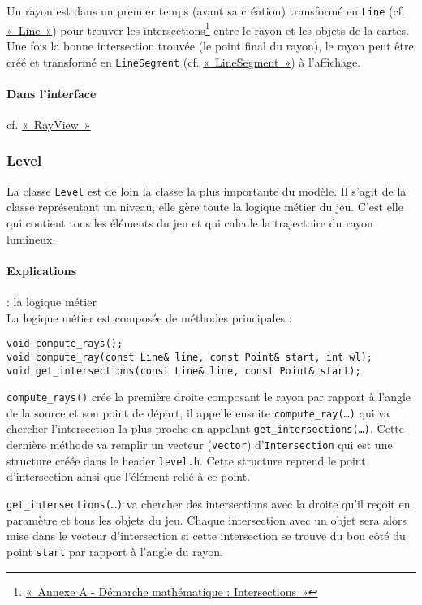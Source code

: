 \documentclass[]{report}
\begin{document}
Un rayon est dans un premier temps (avant sa création) transformé en \texttt{Line} (cf. \hyperref[Line]{«~Line~»}) pour
trouver les intersections\footnote{\hyperref[AnnexeIntersects]{«~Annexe A - Démarche mathématique : Intersections~»}} entre le rayon et les objets de la cartes. Une fois la bonne intersection trouvée (le point final du rayon), le rayon peut être créé et 
transformé en \texttt{LineSegment} (cf. \hyperref[LineSegment]{«~LineSegment~»}) à l'affichage.

\paragraph{Dans l'interface} cf. \hyperref[RayView]{«~RayView~»}

\newpage
\subsubsection{\label{Level}Level}

La classe \texttt{Level} est de loin la classe la plus importante du modèle.
Il s'agit de la classe représentant un niveau, elle gère toute la logique métier
du jeu. C'est elle qui contient tous les éléments du jeu et qui calcule
la trajectoire du rayon lumineux.

\paragraph{Explications} : la logique métier \\

La logique métier est composée de méthodes principales : 

\begin{lstlisting}
void compute_rays();
void compute_ray(const Line& line, const Point& start, int wl);
void get_intersections(const Line& line, const Point& start);
\end{lstlisting}

\texttt{compute\_rays()} crée la première droite composant le rayon par rapport à l'angle de la 
source et son point de départ, il appelle ensuite \texttt{compute\_ray(\dots)} qui va chercher
l'intersection la plus proche en appelant \texttt{get\_intersections(\dots)}. Cette dernière méthode
va remplir un vecteur (\texttt{vector}) d'\texttt{Intersection} qui est une structure créée dans 
le header \texttt{level.h}. Cette structure reprend le point d'intersection ainsi que l'élément relié à ce point.

\texttt{get\_intersections(\dots)} va chercher des intersections avec la droite qu'il reçoit en paramètre
et tous les objets du jeu. Chaque intersection avec un objet sera alors mise dans le vecteur d'intersection
si cette intersection se trouve du bon côté du point \texttt{start} par rapport à l'angle du rayon.
\end{document}
